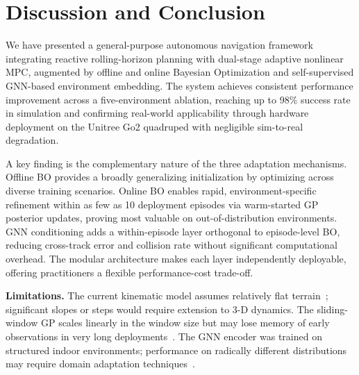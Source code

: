 \documentclass[conference]{IEEEtran}
\begin{document}
\section{Discussion and Conclusion}
\label{sec:conclusion}

We have presented a general-purpose autonomous navigation framework integrating reactive rolling-horizon planning with dual-stage adaptive nonlinear MPC, augmented by offline and online Bayesian Optimization and self-supervised GNN-based environment embedding. The system achieves consistent performance improvement across a five-environment ablation, reaching up to 98\% success rate in simulation and confirming real-world applicability through hardware deployment on the Unitree Go2 quadruped with negligible sim-to-real degradation.

A key finding is the complementary nature of the three adaptation mechanisms. Offline BO provides a broadly generalizing initialization by optimizing across diverse training scenarios. Online BO enables rapid, environment-specific refinement within as few as 10 deployment episodes via warm-started GP posterior updates, proving most valuable on out-of-distribution environments. GNN conditioning adds a within-episode layer orthogonal to episode-level BO, reducing cross-track error and collision rate without significant computational overhead. The modular architecture makes each layer independently deployable, offering practitioners a flexible performance-cost trade-off.

\textbf{Limitations.} The current kinematic model assumes relatively flat terrain~\cite{@TODO}; significant slopes or steps would require extension to 3-D dynamics. The sliding-window GP scales linearly in the window size but may lose memory of early observations in very long deployments~\cite{@TODO}. The GNN encoder was trained on structured indoor environments; performance on radically different distributions may require domain adaptation techniques~\cite{@TODO}.
\end{document}
